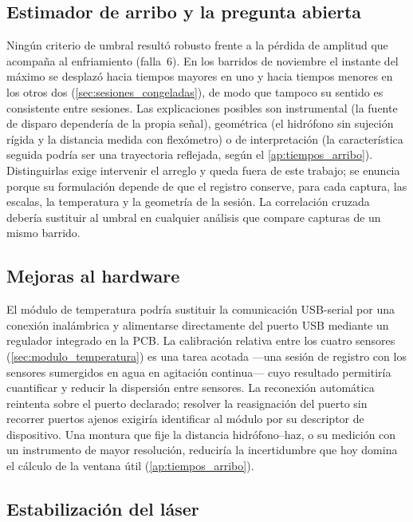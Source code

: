\subsection*{Estimador de arribo y la pregunta abierta}

Ningún criterio de umbral resultó robusto frente a la pérdida de
amplitud que acompaña al enfriamiento (falla~6). En los barridos de noviembre el
instante del máximo se desplazó hacia tiempos mayores en uno y hacia
tiempos menores en los otros dos (\cref{sec:sesiones_congeladas}), de
modo que tampoco su sentido es consistente entre sesiones. Las explicaciones posibles son
instrumental (la fuente de disparo dependería de la propia señal),
geométrica (el hidrófono sin sujeción rígida y la distancia medida con
flexómetro) o de interpretación (la característica seguida podría ser
una trayectoria reflejada, según el \cref{ap:tiempos_arribo}).
Distinguirlas exige intervenir el arreglo y queda fuera de este trabajo;
se enuncia porque su formulación depende de que el registro conserve,
para cada captura, las escalas, la temperatura y la geometría de la
sesión. La correlación cruzada debería sustituir al umbral en cualquier
análisis que compare capturas de un mismo barrido.

\subsection*{Mejoras al hardware}

El módulo de temperatura podría sustituir la comunicación USB-serial
por una conexión inalámbrica y alimentarse directamente del puerto USB
mediante un regulador integrado en la PCB. La calibración relativa entre
los cuatro sensores (\cref{sec:modulo_temperatura}) es una tarea
acotada ---una sesión de registro con los sensores sumergidos en agua en
agitación continua--- cuyo resultado permitiría cuantificar y reducir la
dispersión entre sensores. La reconexión automática reintenta sobre el
puerto declarado; resolver la reasignación del puerto sin recorrer
puertos ajenos exigiría identificar al módulo por su descriptor de
dispositivo. Una montura que fije la
distancia hidrófono--haz, o su medición con un instrumento de mayor
resolución, reduciría la incertidumbre que hoy domina el cálculo de la
ventana útil (\cref{ap:tiempos_arribo}).

\subsection*{Estabilización del láser}

